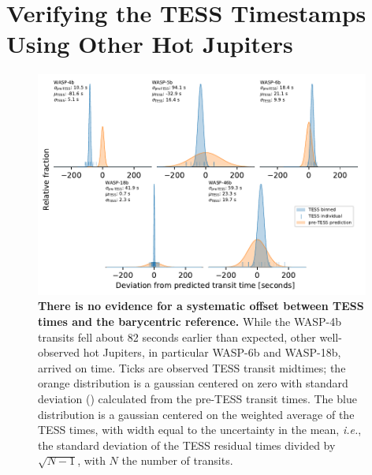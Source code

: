\documentclass[12pt,twocolumn,tighten]{aastex62}
\begin{document}






\clearpage

                            
 


\appendix

\section{Verifying the TESS Timestamps Using Other Hot Jupiters}
\label{sec:verify_tess}

\begin{figure}[t!]
	\begin{center}
		\leavevmode
		\includegraphics[width=0.98\textwidth]{f8.pdf}
	\end{center}
	\vspace{-0.5cm}
	\caption{
		{\bf There is no evidence for a systematic offset between TESS
			times and the barycentric reference.} While the WASP-4b transits
		fell about 82 seconds earlier than expected, other well-observed
		hot Jupiters, in particular WASP-6b and WASP-18b, arrived on time.
		Ticks are observed TESS transit midtimes; the orange distribution
		is a gaussian centered on zero with standard deviation
		() calculated from the pre-TESS transit
		times.  The blue distribution is a gaussian centered on the
		weighted average of the TESS times, with width equal to the
		uncertainty in the mean, {\it i.e.}, the standard deviation
		of the TESS residual times divided by $\sqrt{N-1}$, with $N$ the
		number of transits.
		\label{fig:hjs}
	}
\end{figure}
\end{document}
